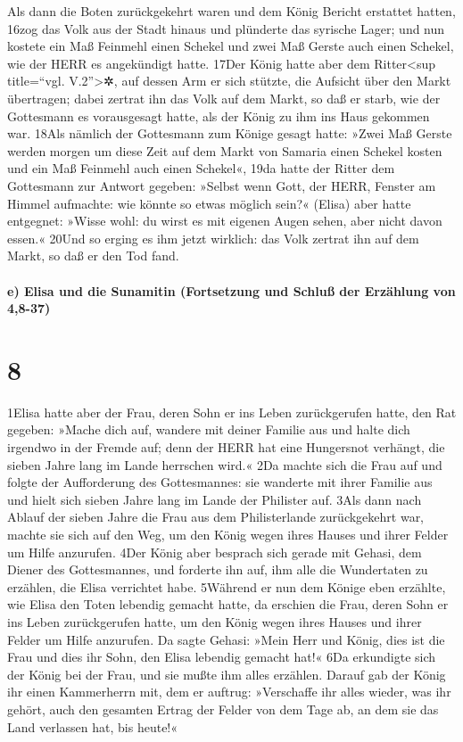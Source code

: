 Als dann die Boten zurückgekehrt waren und dem König Bericht erstattet
hatten, 16zog das Volk aus der Stadt hinaus und plünderte das syrische
Lager; und nun kostete ein Maß Feinmehl einen Schekel und zwei Maß
Gerste auch einen Schekel, wie der HERR es angekündigt hatte. 17Der
König hatte aber dem Ritter\textless sup title=``vgl.
V.2''\textgreater✲, auf dessen Arm er sich stützte, die Aufsicht über
den Markt übertragen; dabei zertrat ihn das Volk auf dem Markt, so daß
er starb, wie der Gottesmann es vorausgesagt hatte, als der König zu ihm
ins Haus gekommen war. 18Als nämlich der Gottesmann zum Könige gesagt
hatte: »Zwei Maß Gerste werden morgen um diese Zeit auf dem Markt von
Samaria einen Schekel kosten und ein Maß Feinmehl auch einen Schekel«,
19da hatte der Ritter dem Gottesmann zur Antwort gegeben: »Selbst wenn
Gott, der HERR, Fenster am Himmel aufmachte: wie könnte so etwas möglich
sein?« (Elisa) aber hatte entgegnet: »Wisse wohl: du wirst es mit
eigenen Augen sehen, aber nicht davon essen.« 20Und so erging es ihm
jetzt wirklich: das Volk zertrat ihn auf dem Markt, so daß er den Tod
fand.

\hypertarget{e-elisa-und-die-sunamitin-fortsetzung-und-schluuxdf-der-erzuxe4hlung-von-48-37}{%
\paragraph{e) Elisa und die Sunamitin (Fortsetzung und Schluß der
Erzählung von
4,8-37)}\label{e-elisa-und-die-sunamitin-fortsetzung-und-schluuxdf-der-erzuxe4hlung-von-48-37}}

\hypertarget{section-7}{%
\section{8}\label{section-7}}

1Elisa hatte aber der Frau, deren Sohn er ins Leben zurückgerufen hatte,
den Rat gegeben: »Mache dich auf, wandere mit deiner Familie aus und
halte dich irgendwo in der Fremde auf; denn der HERR hat eine Hungersnot
verhängt, die sieben Jahre lang im Lande herrschen wird.« 2Da machte
sich die Frau auf und folgte der Aufforderung des Gottesmannes: sie
wanderte mit ihrer Familie aus und hielt sich sieben Jahre lang im Lande
der Philister auf. 3Als dann nach Ablauf der sieben Jahre die Frau aus
dem Philisterlande zurückgekehrt war, machte sie sich auf den Weg, um
den König wegen ihres Hauses und ihrer Felder um Hilfe anzurufen. 4Der
König aber besprach sich gerade mit Gehasi, dem Diener des Gottesmannes,
und forderte ihn auf, ihm alle die Wundertaten zu erzählen, die Elisa
verrichtet habe. 5Während er nun dem Könige eben erzählte, wie Elisa den
Toten lebendig gemacht hatte, da erschien die Frau, deren Sohn er ins
Leben zurückgerufen hatte, um den König wegen ihres Hauses und ihrer
Felder um Hilfe anzurufen. Da sagte Gehasi: »Mein Herr und König, dies
ist die Frau und dies ihr Sohn, den Elisa lebendig gemacht hat!« 6Da
erkundigte sich der König bei der Frau, und sie mußte ihm alles
erzählen. Darauf gab der König ihr einen Kammerherrn mit, dem er
auftrug: »Verschaffe ihr alles wieder, was ihr gehört, auch den gesamten
Ertrag der Felder von dem Tage ab, an dem sie das Land verlassen hat,
bis heute!«

